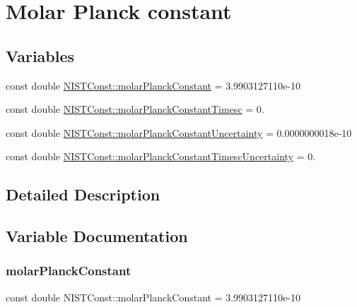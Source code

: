 \hypertarget{group___n_i_s_t_const-_molar_planck_constant}{}\section{Molar Planck constant}
\label{group___n_i_s_t_const-_molar_planck_constant}
\subsection*{Variables}
\begin{DoxyCompactItemize}
\item 
const double \hyperlink{group___n_i_s_t_const-_molar_planck_constant_gaf75c23aa4c9305b0670bc8162fa25b66}{N\+I\+S\+T\+Const\+::molar\+Planck\+Constant} = 3.\+9903127110e-\/10
\item 
const double \hyperlink{group___n_i_s_t_const-_molar_planck_constant_ga4ead25403deaa41d6f95b1252140b8b0}{N\+I\+S\+T\+Const\+::molar\+Planck\+Constant\+Timesc} = 0.
\item 
const double \hyperlink{group___n_i_s_t_const-_molar_planck_constant_ga7634e99b3b26690645162c46aa910ee8}{N\+I\+S\+T\+Const\+::molar\+Planck\+Constant\+Uncertainty} = 0.\+0000000018e-\/10
\item 
const double \hyperlink{group___n_i_s_t_const-_molar_planck_constant_ga933b4c46e23c5f1f1380f3dc21299ad6}{N\+I\+S\+T\+Const\+::molar\+Planck\+Constant\+Timesc\+Uncertainty} = 0.
\end{DoxyCompactItemize}


\subsection{Detailed Description}


\subsection{Variable Documentation}
\mbox{\label{group___n_i_s_t_const-_molar_planck_constant_gaf75c23aa4c9305b0670bc8162fa25b66}} 
\subsubsection{\texorpdfstring{molar\+Planck\+Constant}{molarPlanckConstant}}
{\footnotesize\ttfamily const double N\+I\+S\+T\+Const\+::molar\+Planck\+Constant = 3.\+9903127110e-\/10}

